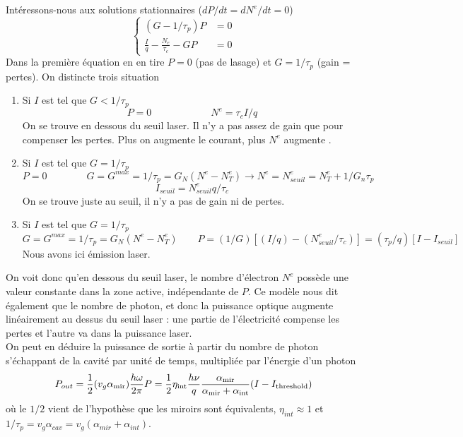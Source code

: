 Intéressons-nous aux solutions stationnaires ($dP/dt = dN^e/dt = 0$)
\begin{equation}
\left\{\begin{array}{ll}
(G - 1/{\tau _p})P &= 0\\
\frac{I}{q} - \frac{{{N_e}}}{{{\tau _c}}} - GP &= 0
\end{array}\right.
\end{equation}
Dans la première équation en en tire $P=0$ (pas de lasage) et $G=1/\tau_p$ (gain = pertes). On 
distincte trois situation
\begin{enumerate}
\item Si $I$ est tel que $G < 1/\tau_p$
\begin{equation}
P = 0\qquad\qquad\qquad N^e = \tau_cI/q
\end{equation}
On se trouve en dessous du seuil laser. Il n'y a pas assez de gain que pour compenser les pertes. Plus
on augmente le courant, plus $N^e$ augmente .

\item Si $I$ est tel que $G = 1/\tau_p$
\begin{equation}
P = 0\qquad\qquad G = G^{max} = 1/\tau_p = G_N(N^e-N^e_T) \to N^e = N^e_{seuil} = N^e_T+1/G_n\tau_p
\end{equation}
\begin{equation}
I_{seuil} = N^e_{seuil} q/\tau_c
\end{equation}
On se trouve juste au seuil, il n'y a pas de gain ni de pertes.\\


\item Si $I$ est tel que $G=1/\tau_p$
\begin{equation}
G = G^{max} = 1/\tau_p = G_N(N^e-N^e_T)\qquad
P = (1/G)[(I/q)-(N^e_{seuil}/\tau_c)] = (\tau_p/q)[I-I_{seuil}]
\end{equation}
Nous avons ici émission laser.
\end{enumerate}

On voit donc qu'en dessous du seuil laser, le nombre d'électron $N^e$ possède une valeur constante dans la zone active, indépendante de $P$. Ce modèle nous dit également que le nombre de photon, et donc
la puissance optique augmente linéairement au dessus du seuil laser : une partie de l'électricité 
compense les pertes et l'autre va dans la puissance laser.\\

On peut en déduire la puissance de sortie à partir du nombre de photon s'échappant de la cavité par
unité de temps, multipliée par l'énergie d'un photon
\begin{equation}
{P_{out}} = \frac{1}{2}({v_g}{\alpha _{{\rm{mir}}}})\frac{{h\omega }}{{2\pi }}P = \frac{1}{2}{\eta _{{\rm{int}}}}\frac{{h\nu }}{q}\frac{{{\alpha _{{\rm{mir}}}}}}{{{\alpha _{{\rm{mir}}}} + {\alpha _{{\rm{int}}}}}}(I - {I_{{\rm{threshold}}}})
\end{equation}
où le $1/2$ vient de l'hypothèse que les miroirs sont équivalents, $\eta_{int}\approx1$ et 
$1/\tau_p = v_g\alpha_{cav} = v_g(\alpha_{mir}+\alpha_{int})$.\\


